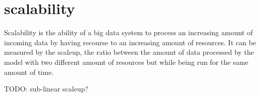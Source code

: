 \chapter{scalability}

Scalability is the ability of a big data system to process
an increasing amount of incoming data by having recourse
to an increasing amount of resources. It can be measured
by the scaleup, the ratio between the amount of data processed
by the model with two different amount of resources but
while being run for the same amount of time.

TODO: sub-linear scaleup?
